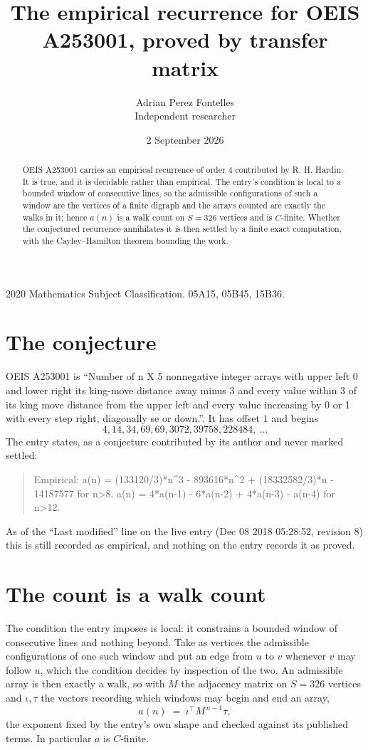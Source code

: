 \documentclass[11pt,a4paper]{article}
\title{The empirical recurrence for OEIS A253001, proved by transfer matrix}
\author{Adrian Perez Fontelles\\ \small Independent researcher}
\date{2 September 2026}
\theoremstyle{plain}
\theoremstyle{definition}
\begin{document}
\maketitle

\begin{abstract}
OEIS A253001 carries an empirical recurrence of order $4$ contributed by R. H. Hardin. It is
true, and it is decidable rather than empirical. The entry's condition is local to a bounded window of consecutive lines, so
the admissible configurations of such a window are the vertices of a finite digraph and the
arrays counted are exactly the walks in it; hence $a(n)$ is a walk count on $S=326$ vertices
and is $C$-finite. Whether the conjectured recurrence annihilates it is then settled by a
finite exact computation, with the Cayley--Hamilton theorem bounding the work.
\end{abstract}

\noindent\small 2020 Mathematics Subject Classification. 05A15, 05B45, 15B36.\normalsize

\section{The conjecture}

OEIS A253001 is ``Number of n X 5 nonnegative integer arrays with upper left 0 and lower right its king-move distance away minus 3 and every value within 3 of its king move distance from the upper left and every value increasing by 0 or 1 with every step right, diagonally se or down.''. It has offset $1$ and begins
\[
4, 14, 34, 69, 69, 3072, 39758, 228484,\ \dots
\]
The entry states, as a conjecture contributed by its author and never marked settled:
\begin{quote}
Empirical: a(n) = (133120/3)*n\^{}3 - 893616*n\^{}2 + (18332582/3)*n - 14187577 for n>8. a(n) = 4*a(n-1) - 6*a(n-2) + 4*a(n-3) - a(n-4) for n>12.
\end{quote}
As of the ``Last modified'' line on the live entry (Dec 08 2018 05:28:52, revision 8) this is still
recorded as empirical, and nothing on the entry records it as proved.

\section{The count is a walk count}

The condition the entry imposes is local: it constrains a bounded window of consecutive lines and nothing beyond. Take as
vertices the admissible configurations of one such window and put an edge from $u$ to $v$
whenever $v$ may follow $u$, which the condition decides by inspection of the two. An
admissible array is then exactly a walk, so with $M$ the adjacency matrix on $S=326$ vertices
and $\iota,\tau$ the vectors recording which windows may begin and end an array,
\[
a(n)\;=\;\iota^{\!\top}M^{\,n-1}\tau ,
\]
the exponent fixed by the entry's own shape and checked against its published terms. In
particular $a$ is $C$-finite.
\end{document}
